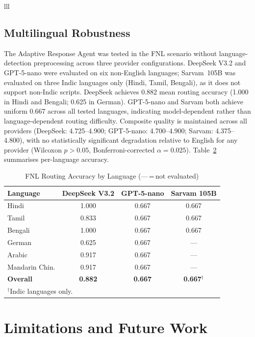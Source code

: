 \documentclass[conference]{IEEEtran}
\begin{document}
\begin{table}[htbp]
\begin{center}
\begin{tabular}{lll}
\subsection{Multilingual Robustness}

The Adaptive Response Agent was tested in the FNL scenario without language-detection preprocessing across three provider configurations. DeepSeek V3.2 and GPT-5-nano were evaluated on six non-English languages; Sarvam~105B was evaluated on three Indic languages only (Hindi, Tamil, Bengali), as it does not support non-Indic scripts. DeepSeek achieves 0.882 mean routing accuracy (1.000 in Hindi and Bengali; 0.625 in German). GPT-5-nano and Sarvam both achieve uniform 0.667 across all tested languages, indicating model-dependent rather than language-dependent routing difficulty. Composite quality is maintained across all providers (DeepSeek: 4.725--4.900; GPT-5-nano: 4.700--4.900; Sarvam: 4.375--4.800), with no statistically significant degradation relative to English for any provider (Wilcoxon $p > 0.05$, Bonferroni-corrected $\alpha = 0.025$). Table~\ref{tab:multilingual_paper} summarises per-language accuracy.

\begin{table}[htbp]
\caption{FNL Routing Accuracy by Language (---\,=\,not evaluated)}
\label{tab:multilingual_paper}
\begin{center}
\scriptsize
\setlength{\tabcolsep}{3pt}
\begin{tabular}{lccc}
\toprule
\textbf{Language} & \textbf{DeepSeek V3.2} & \textbf{GPT-5-nano} & \textbf{Sarvam 105B} \\
\midrule
Hindi           & 1.000 & 0.667 & 0.667 \\
Tamil           & 0.833 & 0.667 & 0.667 \\
Bengali         & 1.000 & 0.667 & 0.667 \\
German          & 0.625 & 0.667 & ---   \\
Arabic          & 0.917 & 0.667 & ---   \\
Mandarin Chin.  & 0.917 & 0.667 & ---   \\
\midrule
\textbf{Overall} & \textbf{0.882} & \textbf{0.667} & \textbf{0.667}$^\dagger$ \\
\bottomrule
\multicolumn{4}{l}{\scriptsize $^\dagger$Indic languages only.}
\end{tabular}
\end{center}
\end{table}

\section{Limitations and Future Work}


\end{tabular}
\end{center}
\end{table}
\end{document}
